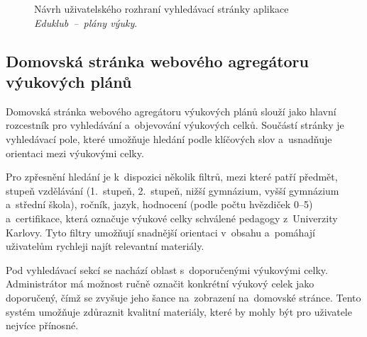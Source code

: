 \documentclass[male,czech,api_bc]{kitheses}
\begin{document}
\begin{figure}[H]
	\centering
	\caption{Návrh uživatelského rozhraní vyhledávací stránky aplikace \textit{Eduklub~--~plány výuky}.}
	\label{fig:eduklub-navrh-2}
\end{figure}

\subsection{Domovská stránka webového agregátoru výukových plánů}

Domovská stránka webového agregátoru výukových plánů slouží jako hlavní rozcestník pro vyhledávání a~objevování výukových celků. Součástí stránky je vyhledávací pole, které umožňuje hledání podle klíčových slov a~usnadňuje orientaci mezi výukovými celky.

Pro zpřesnění hledání je k~dispozici několik filtrů, mezi které patří předmět, stupeň vzdělávání (1.~stupeň, 2.~stupeň, nižší gymnázium, vyšší gymnázium a~střední škola), ročník, jazyk, hodnocení (podle počtu hvězdiček 0--5) a~certifikace, která označuje výukové celky schválené pedagogy z~Univerzity Karlovy. Tyto filtry umožňují snadnější orientaci v~obsahu a~pomáhají uživatelům rychleji najít relevantní materiály.

Pod vyhledávací sekcí se nachází oblast s~doporučenými výukovými celky. Administrátor má možnost ručně označit konkrétní výukový celek jako doporučený, čímž se zvyšuje jeho šance na~zobrazení na~domovské stránce. Tento systém umožňuje zdůraznit kvalitní materiály, které by mohly být pro uživatele nejvíce přínosné.
\end{document}
